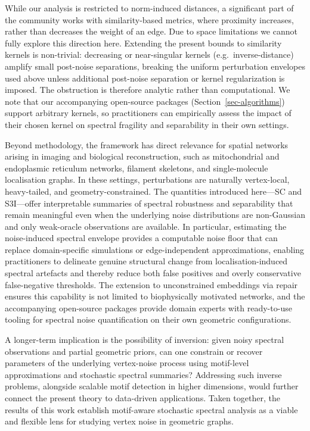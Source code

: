 \documentclass[
  11pt,
  letterpaper]{siamart251216}
\begin{document}
While our analysis is restricted to norm-induced distances, a
significant part of the community works with similarity-based metrics,
where proximity increases, rather than decreases the weight of an edge.
Due to space limitations we cannot fully explore this direction here.
Extending the present bounds to similarity kernels is non-trivial:
decreasing or near-singular kernels (e.g.~inverse-distance) amplify
small post-noise separations, breaking the uniform perturbation
envelopes used above unless additional post-noise separation or kernel
regularization is imposed. The obstruction is therefore analytic rather
than computational. We note that our accompanying open-source packages
(Section~\ref{sec-algorithms}) support arbitrary kernels, so
practitioners can empirically assess the impact of their chosen kernel
on spectral fragility and separability in their own settings.

Beyond methodology, the framework has direct relevance for spatial
networks arising in imaging and biological reconstruction, such as
mitochondrial and endoplasmic reticulum networks, filament skeletons,
and single-molecule localisation graphs. In these settings,
perturbations are naturally vertex-local, heavy-tailed, and
geometry-constrained. The quantities introduced here---\ac{SC} and
\ac{S3I}---offer interpretable summaries of spectral robustness and
separability that remain meaningful even when the underlying noise
distributions are non-Gaussian and only weak-oracle observations are
available. In particular, estimating the noise-induced spectral envelope
provides a computable noise floor that can replace domain-specific
simulations or edge-independent approximations, enabling practitioners
to delineate genuine structural change from localisation-induced
spectral artefacts and thereby reduce both false positives and overly
conservative false-negative thresholds. The extension to unconstrained
embeddings via repair ensures this capability is not limited to
biophysically motivated networks, and the accompanying open-source
packages provide domain experts with ready-to-use tooling for spectral
noise quantification on their own geometric configurations.

A longer-term implication is the possibility of inversion: given noisy
spectral observations and partial geometric priors, can one constrain or
recover parameters of the underlying vertex-noise process using
motif-level approximations and stochastic spectral summaries? Addressing
such inverse problems, alongside scalable motif detection in higher
dimensions, would further connect the present theory to data-driven
applications. Taken together, the results of this work establish
motif-aware stochastic spectral analysis as a viable and flexible lens
for studying vertex noise in geometric graphs.
\end{document}

